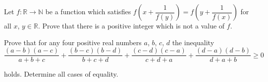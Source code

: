\item[\textbf{A6.}]
Let 
$ f: \mathbb{R}\to\mathbb{N}$
 be a function which satisfies 
$ f\left(x + \dfrac{1}{f(y)}\right) = f\left(y + \dfrac{1}{f(x)}\right)$
 for all 
$ x$, 
$ y\in\mathbb{R}$.
 Prove that there is a positive integer which is not a value of 
$ f$.

\item[\textbf{A7.}]
Prove that for any four positive real numbers 
$ a$, 
$ b$, 
$ c$, 
$ d$
 the inequality
\[ \frac {(a - b)(a - c)}{a + b + c} + \frac {(b - c)(b - d)}{b + c + d} + \frac {(c - d)(c - a)}{c + d + a} + \frac {(d - a)(d - b)}{d + a + b}\ge 0\]

holds. Determine all cases of equality.
